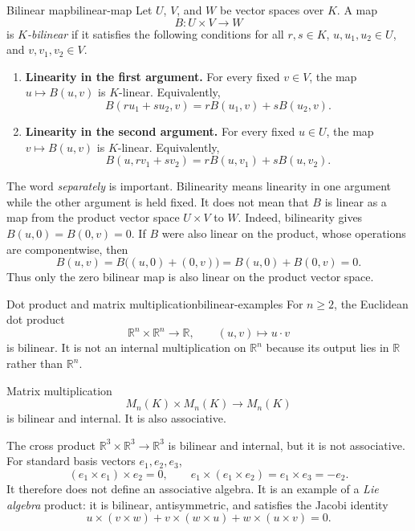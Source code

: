 \documentclass[10pt,a4paper]{article}
\newcommand{\R}{\mathbb{R}}
\begin{document}
\begin{definition}{Bilinear map}{bilinear-map}
Let $U$, $V$, and $W$ be vector spaces over $K$. A map
\[
  B:U\times V\longrightarrow W
\]
is \emph{$K$-bilinear} if it satisfies the following conditions for all
$r,s\in K$, $u,u_1,u_2\in U$, and $v,v_1,v_2\in V$.
\begin{enumerate}[label=\textup{(BL\arabic*)},leftmargin=3.5em]
  \item \textbf{Linearity in the first argument.} For every fixed $v\in V$,
  the map $u\mapsto B(u,v)$ is $K$-linear. Equivalently,
  \[
    B(ru_1+su_2,v)=rB(u_1,v)+sB(u_2,v).
  \]

  \item \textbf{Linearity in the second argument.} For every fixed $u\in U$,
  the map $v\mapsto B(u,v)$ is $K$-linear. Equivalently,
  \[
    B(u,rv_1+sv_2)=rB(u,v_1)+sB(u,v_2).
  \]
\end{enumerate}
\end{definition}

The word \emph{separately} is important. Bilinearity means linearity in one
argument while the other argument is held fixed. It does not mean that $B$ is
linear as a map from the product vector space $U\times V$ to $W$.
Indeed, bilinearity gives $B(u,0)=B(0,v)=0$. If $B$ were also linear on the
product, whose operations are componentwise, then
\[
  B(u,v)=B\bigl((u,0)+(0,v)\bigr)=B(u,0)+B(0,v)=0.
\]
Thus only the zero bilinear map is also linear on the product vector space.

\begin{examplebox}{Dot product and matrix multiplication}{bilinear-examples}
For $n\geq2$, the Euclidean dot product
\[
  \R^n\times\R^n\longrightarrow\R,
  \qquad
  (u,v)\longmapsto u\cdot v
\]
is bilinear. It is not an internal multiplication on $\R^n$ because its output
lies in $\R$ rather than $\R^n$.

Matrix multiplication
\[
  M_n(K)\times M_n(K)\longrightarrow M_n(K)
\]
is bilinear and internal. It is also associative.
\end{examplebox}

\begin{precision}
The cross product $\R^3\times\R^3\to\R^3$ is bilinear and internal, but it is
not associative. For standard basis vectors $e_1,e_2,e_3$,
\[
  (e_1\times e_1)\times e_2=0,
  \qquad
  e_1\times(e_1\times e_2)=e_1\times e_3=-e_2.
\]
It therefore does not define an associative algebra. It is an example of a
\emph{Lie algebra} product: it is bilinear, antisymmetric, and satisfies the
Jacobi identity
\[
  u\times(v\times w)+v\times(w\times u)+w\times(u\times v)=0.
\]
\end{precision}
\end{document}
